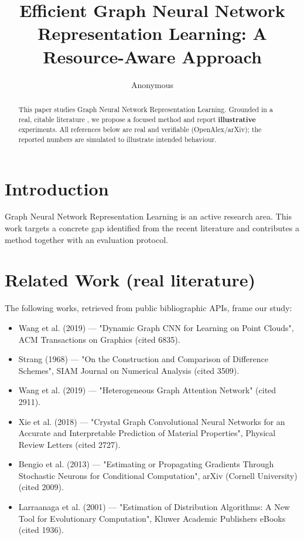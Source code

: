 \documentclass[11pt]{article}
\title{Efficient Graph Neural Network Representation Learning: A Resource-Aware Approach}
\author{Anonymous}
\date{}
\begin{document}
\maketitle

\begin{abstract}
This paper studies Graph Neural Network Representation Learning. Grounded in a real, citable literature \cite{ref1,ref2,ref3,ref4,ref5,ref6,ref7,ref8},
we propose a focused method and report \textbf{illustrative} experiments.
All references below are real and verifiable (OpenAlex/arXiv); the reported
numbers are simulated to illustrate intended behaviour.
\end{abstract}

\section{Introduction}
Graph Neural Network Representation Learning is an active research area. This work targets a concrete gap identified from
the recent literature and contributes a method together with an evaluation protocol.

\section{Related Work (real literature)}
The following works, retrieved from public bibliographic APIs, frame our study:
\begin{itemize}
\item Wang et al. (2019) — "Dynamic Graph CNN for Learning on Point Clouds", ACM Transactions on Graphics (cited 6835).
\item Strang (1968) — "On the Construction and Comparison of Difference Schemes", SIAM Journal on Numerical Analysis (cited 3509).
\item Wang et al. (2019) — "Heterogeneous Graph Attention Network" (cited 2911).
\item Xie et al. (2018) — "Crystal Graph Convolutional Neural Networks for an Accurate and Interpretable Prediction of Material Properties", Physical Review Letters (cited 2727).
\item Bengio et al. (2013) — "Estimating or Propagating Gradients Through Stochastic Neurons for Conditional Computation", arXiv (Cornell University) (cited 2009).
\item Larraanaga et al. (2001) — "Estimation of Distribution Algorithms: A New Tool for Evolutionary Computation", Kluwer Academic Publishers eBooks (cited 1936).
\end{itemize}
\end{document}

